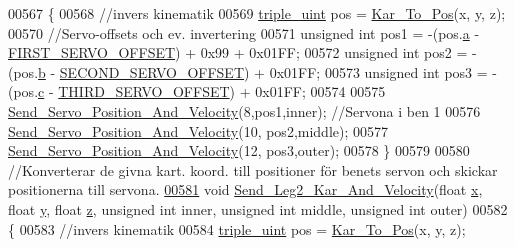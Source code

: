 \begin{DoxyCode}
00567 \{
00568     \textcolor{comment}{//invers kinematik }
00569     \hyperlink{structtriple__uint}{triple\_uint} pos = \hyperlink{invers__kinematik_8c_a68f82386196ad991ed54fb9796d90f7c}{Kar\_To\_Pos}(x, y, z);
00570     \textcolor{comment}{//Servo-offsets och ev. invertering }
00571     \textcolor{keywordtype}{unsigned} \textcolor{keywordtype}{int} pos1 = -(pos.\hyperlink{structtriple__uint_a0ea8a85723620c90be9fd2a693f12a59}{a} - \hyperlink{servo___u_a_r_t_8c_a4c437d01d2f060ec86c16ed5e76efe45}{FIRST\_SERVO\_OFFSET}) + 0x99 + 0x01FF;
00572     \textcolor{keywordtype}{unsigned} \textcolor{keywordtype}{int} pos2 = -(pos.\hyperlink{structtriple__uint_a790d5baa17ec7aaf7bb49750a16e9c29}{b} - \hyperlink{servo___u_a_r_t_8c_acb02dedbe5ff19694bdb5b2ddf61664a}{SECOND\_SERVO\_OFFSET}) + 0x01FF;
00573     \textcolor{keywordtype}{unsigned} \textcolor{keywordtype}{int} pos3 = -(pos.\hyperlink{structtriple__uint_a6ce17b018c47d0f1d0e53a458f741ad3}{c} - \hyperlink{servo___u_a_r_t_8c_ac2f065c44b617c91ea7f4237e8ead729}{THIRD\_SERVO\_OFFSET}) + 0x01FF;
00574     
00575     \hyperlink{servo___u_a_r_t_8c_aef28545296037ecc0350638a407a680f}{Send\_Servo\_Position\_And\_Velocity}(8,pos1,inner); \textcolor{comment}{//Servona i ben 1}
00576     \hyperlink{servo___u_a_r_t_8c_aef28545296037ecc0350638a407a680f}{Send\_Servo\_Position\_And\_Velocity}(10, pos2,middle);
00577     \hyperlink{servo___u_a_r_t_8c_aef28545296037ecc0350638a407a680f}{Send\_Servo\_Position\_And\_Velocity}(12, pos3,outer);
00578 \}
00579 
00580 \textcolor{comment}{//Konverterar de givna kart. koord. till positioner för benets servon och skickar positionerna till
       servona.}
\hypertarget{servo___u_a_r_t_8c_source.tex_l00581}{}\hyperlink{servo___u_a_r_t_8h_a7ab1230fdabe0bcf16d18c331c75057e}{00581} \textcolor{keywordtype}{void} \hyperlink{servo___u_a_r_t_8c_a7ab1230fdabe0bcf16d18c331c75057e}{Send\_Leg2\_Kar\_And\_Velocity}(\textcolor{keywordtype}{float} \hyperlink{sensor_8h_a6c4b361d72eb3767ba424ac9a6ecf52b}{x}, \textcolor{keywordtype}{float} \hyperlink{sensor_8h_a0ed6a908288e0cd87f79c1b5ab56d07c}{y}, \textcolor{keywordtype}{float} 
      \hyperlink{over__hinder_8c_af73583b1e980b0aa03f9884812e9fd4d}{z}, \textcolor{keywordtype}{unsigned} \textcolor{keywordtype}{int} inner, \textcolor{keywordtype}{unsigned} \textcolor{keywordtype}{int} middle, \textcolor{keywordtype}{unsigned} \textcolor{keywordtype}{int} outer)
00582 \{
00583     \textcolor{comment}{//invers kinematik }
00584     \hyperlink{structtriple__uint}{triple\_uint} pos = \hyperlink{invers__kinematik_8c_a68f82386196ad991ed54fb9796d90f7c}{Kar\_To\_Pos}(x, y, z);

\end{DoxyCode}
